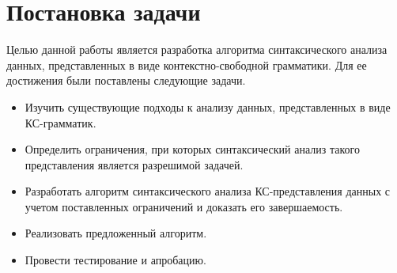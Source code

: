 \section{Постановка задачи}
Целью данной работы является разработка алгоритма синтаксического анализа данных, представленных в виде контекстно-свободной грамматики. Для ее достижения были поставлены следующие задачи.
\begin{itemize}
	\item Изучить существующие подходы к анализу данных, представленных в виде КС-грамматик.
	\item Определить ограничения, при которых синтаксический анализ такого представления является разрешимой задачей.
	\item Разработать алгоритм синтаксического анализа КС-представления данных с учетом поставленных ограничений и доказать его завершаемость.
	\item Реализовать предложенный алгоритм.
	\item Провести тестирование и апробацию.
\end{itemize}